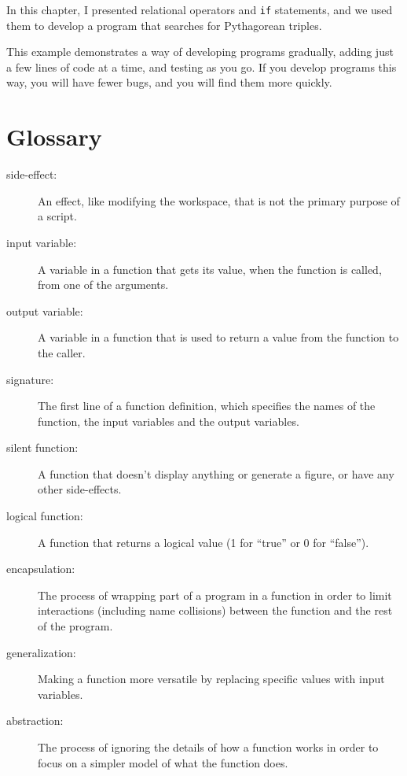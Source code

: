In this chapter, I presented relational operators and {\tt if} statements, and we used them to develop a program that searches for Pythagorean triples.

This example demonstrates a way of developing programs gradually, adding just a few lines of code at a time, and testing as you go.  If you develop programs this way, you will have fewer bugs, and you will find them more quickly.


\section{Glossary}

\begin{description}

\item[side-effect:] An effect, like modifying the workspace, that
is not the primary purpose of a script.

\item[input variable:] A variable in a function that gets its value,
when the function is called, from one of the arguments.

\item[output variable:] A variable in a function that is used to
return a value from the function to the caller.

\item[signature:] The first line of a function definition, which
specifies the names of the function, the input variables and the
output variables.

\item[silent function:] A function that doesn't display anything
or generate a figure, or have any other side-effects.

\item[logical function:] A function that returns a logical value
(1 for ``true'' or 0 for ``false'').

\item[encapsulation:] The process of wrapping part of a program in
a function in order to limit interactions (including name collisions)
between the function and the rest of the program.

\item[generalization:] Making a function more versatile by replacing
specific values with input variables.

\item[abstraction:] The process of ignoring the details of how
a function works in order to focus on a simpler model of what the
function does.

\end{description}


